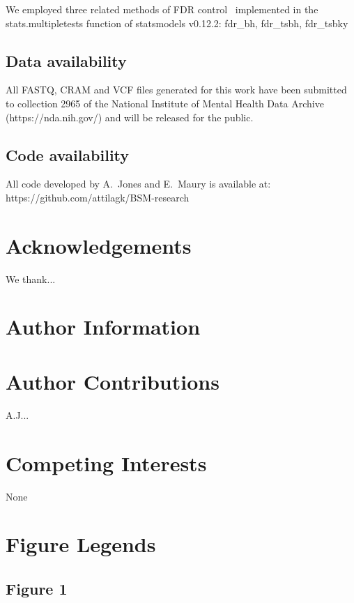 \documentclass[letterpaper]{article}
\begin{document}
We employed three related methods of FDR
control~\citep{Benjamini:1995ml,Benjamini2006} implemented in the
stats.multipletests function of statsmodels v0.12.2:
fdr\_bh, fdr\_tsbh, fdr\_tsbky

\subsection*{Data availability}

All FASTQ, CRAM and VCF files generated for this work have been submitted to
collection 2965 of the National Institute of Mental Health Data Archive
(https://nda.nih.gov/) and will be released for the public.

\subsection*{Code availability}

All code developed by A.~Jones and E.~Maury is available at:\\
https://github.com/attilagk/BSM-research




\section*{Acknowledgements}

We thank...

\section*{Author Information}

\section*{Author Contributions}

A.J...

\section*{Competing Interests}

None

\section*{Figure Legends}

\subsection*{Figure 1}
\end{document}
